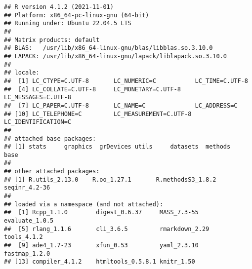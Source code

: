 \documentclass[
]{article}
\begin{document}
\begin{verbatim}
## R version 4.1.2 (2021-11-01)
## Platform: x86_64-pc-linux-gnu (64-bit)
## Running under: Ubuntu 22.04.5 LTS
## 
## Matrix products: default
## BLAS:   /usr/lib/x86_64-linux-gnu/blas/libblas.so.3.10.0
## LAPACK: /usr/lib/x86_64-linux-gnu/lapack/liblapack.so.3.10.0
## 
## locale:
##  [1] LC_CTYPE=C.UTF-8       LC_NUMERIC=C           LC_TIME=C.UTF-8       
##  [4] LC_COLLATE=C.UTF-8     LC_MONETARY=C.UTF-8    LC_MESSAGES=C.UTF-8   
##  [7] LC_PAPER=C.UTF-8       LC_NAME=C              LC_ADDRESS=C          
## [10] LC_TELEPHONE=C         LC_MEASUREMENT=C.UTF-8 LC_IDENTIFICATION=C   
## 
## attached base packages:
## [1] stats     graphics  grDevices utils     datasets  methods   base     
## 
## other attached packages:
## [1] R.utils_2.13.0    R.oo_1.27.1       R.methodsS3_1.8.2 seqinr_4.2-36    
## 
## loaded via a namespace (and not attached):
##  [1] Rcpp_1.1.0        digest_0.6.37     MASS_7.3-55       evaluate_1.0.5   
##  [5] rlang_1.1.6       cli_3.6.5         rmarkdown_2.29    tools_4.1.2      
##  [9] ade4_1.7-23       xfun_0.53         yaml_2.3.10       fastmap_1.2.0    
## [13] compiler_4.1.2    htmltools_0.5.8.1 knitr_1.50
\end{verbatim}
\end{document}
